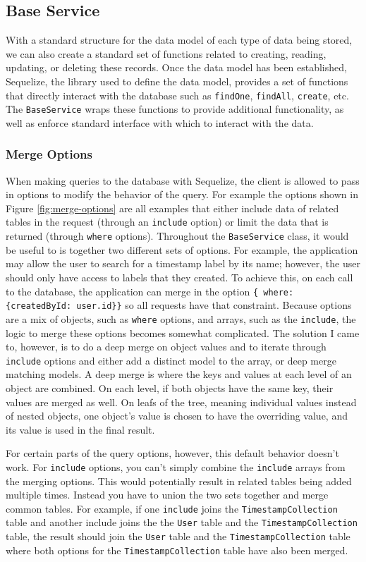 \subsection{Base Service}
With a standard structure for the data model of each type of data being stored, we can also create a standard set of functions related to creating, reading, updating, or deleting these records.  Once the data model has been established, Sequelize, the library used to define the data model, provides a set of functions that directly interact with the database such as \verb!findOne!, \verb!findAll!, \verb!create!, etc.  The \verb!BaseService! wraps these functions to provide additional functionality, as well as enforce standard interface with which to interact with the data.

\subsubsection{Merge Options}
When making queries to the database with Sequelize, the client is allowed to pass in options to modify the behavior of the query.  For example the options shown in Figure \ref{fig:merge-options} are all examples that either include data of related tables in the request (through an \verb!include! option) or limit the data that is returned (through \verb!where! options).  Throughout the \verb!BaseService! class, it would be useful to is together two different sets of options.  For example, the application may allow the user to search for a timestamp label by its name; however, the user should only have access to labels that they created.  To achieve this, on each call to the database, the application can merge in the option \verb!{ where: {createdById: user.id}}! so all requests have that constraint.  Because options are a mix of objects, such as \verb!where! options, and arrays, such as the \verb!include!, the logic to merge these options becomes somewhat complicated.  The solution I came to, however, is to do a deep merge on object values and to iterate through \verb!include! options and either add a distinct model to the array, or deep merge matching models.  A deep merge is where the keys and values at each level of an object are combined. On each level, if both objects have the same key, their values are merged as well.  On leafs of the tree, meaning individual values instead of nested objects, one object's value is chosen to have the overriding value, and its value is used in the final result.

For certain parts of the query options, however, this default behavior doesn't work.  For \verb!include! options, you can't simply combine the \verb!include! arrays from the merging options.  This would potentially result in related tables being added multiple times.  Instead you have to union the two sets together and merge common tables. For example, if one \verb!include! joins the \verb!TimestampCollection! table and another include joins the the \verb!User! table and the \verb!TimestampCollection! table, the result should join the \verb!User! table and the \verb!TimestampCollection! table where both options for the \verb!TimestampCollection! table have also been merged.


